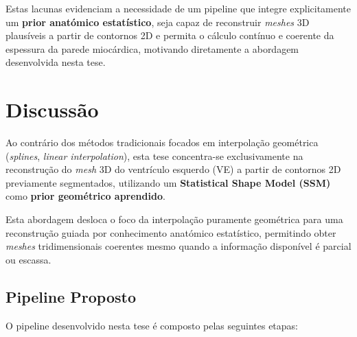 \documentclass[12pt,a4paper]{report}
\begin{document}
Estas lacunas evidenciam a necessidade de um pipeline que integre explicitamente um \textbf{prior anatómico estatístico}, seja capaz de reconstruir \textit{meshes} 3D plausíveis a partir de contornos 2D e permita o cálculo contínuo e coerente da espessura da parede miocárdica, motivando diretamente a abordagem desenvolvida nesta tese.

\chapter{Discussão}

Ao contrário dos métodos tradicionais focados em interpolação geométrica (\textit{splines}, \textit{linear interpolation}), esta tese concentra-se exclusivamente na reconstrução do \textit{mesh} 3D do ventrículo esquerdo (VE) a partir de contornos 2D previamente segmentados, utilizando um \textbf{Statistical Shape Model (SSM)} como \textbf{prior geométrico aprendido}.

Esta abordagem desloca o foco da interpolação puramente geométrica para uma reconstrução guiada por conhecimento anatómico estatístico, permitindo obter \textit{meshes} tridimensionais coerentes mesmo quando a informação disponível é parcial ou escassa.

\section{Pipeline Proposto}

O pipeline desenvolvido nesta tese é composto pelas seguintes etapas:
\end{document}
